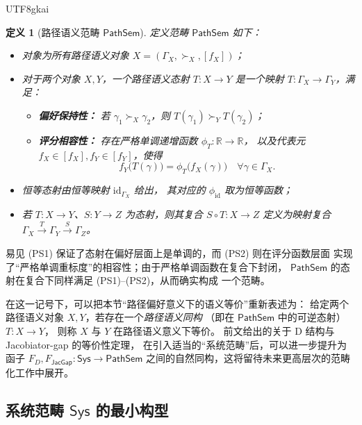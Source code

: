 \documentclass[12pt]{article}
\newtheorem{definition}{定义}[section]
\newcommand{\JacGap}{\mathsf{JacGap}}
\begin{document}
\begin{CJK*}{UTF8}{gkai}
\begin{definition}[路径语义范畴 $\mathsf{PathSem}$]
定义范畴 $\mathsf{PathSem}$ 如下：
  \begin{itemize}
    \item 对象为所有路径语义对象 $X=(\Gamma_X,\succ_X,[f_X])$；
    \item 对于两个对象 $X,Y$，一个\emph{路径语义态射}
          $T:X\to Y$ 是一个映射
          $T:\Gamma_X\to\Gamma_Y$，满足：
          \begin{itemize}
            \item[(PS1)] \textbf{偏好保持性：}
              若 $\gamma_1\succ_X\gamma_2$，则
              $T(\gamma_1)\succ_Y T(\gamma_2)$；
            \item[(PS2)] \textbf{评分相容性：}
              存在严格单调递增函数 $\phi_T:\mathbb{R}\to\mathbb{R}$，
              以及代表元 $f_X\in[f_X],f_Y\in[f_Y]$，使得
              \[
                f_Y\bigl(T(\gamma)\bigr)
                =
                \phi_T\bigl(f_X(\gamma)\bigr)
                \quad\forall\gamma\in\Gamma_X.
              \]
          \end{itemize}
    \item 恒等态射由恒等映射 $\mathrm{id}_{\Gamma_X}$ 给出，
          其对应的 $\phi_{\mathrm{id}}$ 取为恒等函数；
    \item 若 $T:X\to Y$、$S:Y\to Z$ 为态射，则其复合
          $S\circ T:X\to Z$ 定义为映射复合
          $\Gamma_X\xrightarrow{T}\Gamma_Y\xrightarrow{S}\Gamma_Z$。
  \end{itemize}
\end{definition}

易见 (PS1) 保证了态射在偏好层面上是单调的，而 (PS2) 则在评分函数层面
实现了“严格单调重标度”的相容性；由于严格单调函数在复合下封闭，
$\mathsf{PathSem}$ 的态射在复合下同样满足 (PS1)–(PS2)，从而确实构成
一个范畴。

在这一记号下，可以把本节“路径偏好意义下的语义等价”重新表述为：
给定两个路径语义对象 $X,Y$，若存在一个\emph{路径语义同构}
（即在 $\mathsf{PathSem}$ 中的可逆态射）$T:X\to Y$，
则称 $X$ 与 $Y$ 在路径语义意义下等价。
前文给出的关于 D 结构与 Jacobiator-gap 的等价性定理，
在引入适当的“系统范畴”后，可以进一步提升为
函子 $F_D,F_{\JacGap}:\mathsf{Sys}\to\mathsf{PathSem}$
之间的自然同构，这将留待未来更高层次的范畴化工作中展开。

\subsection{系统范畴 $\mathsf{Sys}$ 的最小构型}


\end{CJK*}
\end{document}
